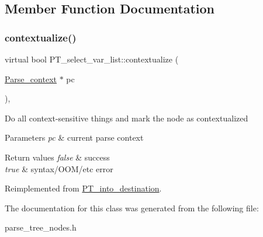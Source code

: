 \subsection{Member Function Documentation}
\mbox{\label{classPT__select__var__list_a5b792bf23c127377a3ff4fc30c298fcd}} 
\subsubsection{\texorpdfstring{contextualize()}{contextualize()}}
{\footnotesize\ttfamily virtual bool P\+T\+\_\+select\+\_\+var\+\_\+list\+::contextualize (\begin{DoxyParamCaption}\item[{\mbox{\hyperlink{structParse__context}{Parse\+\_\+context}} $\ast$}]{pc }\end{DoxyParamCaption})\hspace{0.3cm}{\ttfamily [inline]}, {\ttfamily [virtual]}}

Do all context-\/sensitive things and mark the node as contextualized


\begin{DoxyParams}{Parameters}
{\em pc} & current parse context\\
\hline
\end{DoxyParams}

\begin{DoxyRetVals}{Return values}
{\em false} & success \\
\hline
{\em true} & syntax/\+O\+O\+M/etc error \\
\hline
\end{DoxyRetVals}


Reimplemented from \mbox{\hyperlink{classPT__into__destination_aa713703e7bae0b070f8a05bcfc0a71a3}{P\+T\+\_\+into\+\_\+destination}}.



The documentation for this class was generated from the following file\+:\begin{DoxyCompactItemize}
\item 
parse\+\_\+tree\+\_\+nodes.\+h\end{DoxyCompactItemize}

